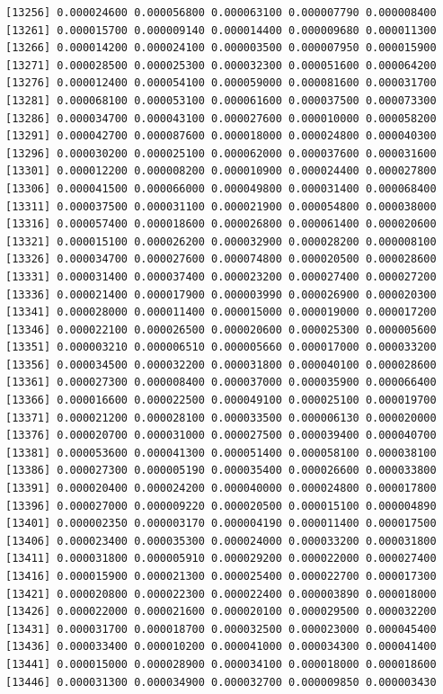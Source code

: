 \documentclass[]{article}
\begin{document}
\begin{verbatim}
[13256] 0.000024600 0.000056800 0.000063100 0.000007790 0.000008400
[13261] 0.000015700 0.000009140 0.000014400 0.000009680 0.000011300
[13266] 0.000014200 0.000024100 0.000003500 0.000007950 0.000015900
[13271] 0.000028500 0.000025300 0.000032300 0.000051600 0.000064200
[13276] 0.000012400 0.000054100 0.000059000 0.000081600 0.000031700
[13281] 0.000068100 0.000053100 0.000061600 0.000037500 0.000073300
[13286] 0.000034700 0.000043100 0.000027600 0.000010000 0.000058200
[13291] 0.000042700 0.000087600 0.000018000 0.000024800 0.000040300
[13296] 0.000030200 0.000025100 0.000062000 0.000037600 0.000031600
[13301] 0.000012200 0.000008200 0.000010900 0.000024400 0.000027800
[13306] 0.000041500 0.000066000 0.000049800 0.000031400 0.000068400
[13311] 0.000037500 0.000031100 0.000021900 0.000054800 0.000038000
[13316] 0.000057400 0.000018600 0.000026800 0.000061400 0.000020600
[13321] 0.000015100 0.000026200 0.000032900 0.000028200 0.000008100
[13326] 0.000034700 0.000027600 0.000074800 0.000020500 0.000028600
[13331] 0.000031400 0.000037400 0.000023200 0.000027400 0.000027200
[13336] 0.000021400 0.000017900 0.000003990 0.000026900 0.000020300
[13341] 0.000028000 0.000011400 0.000015000 0.000019000 0.000017200
[13346] 0.000022100 0.000026500 0.000020600 0.000025300 0.000005600
[13351] 0.000003210 0.000006510 0.000005660 0.000017000 0.000033200
[13356] 0.000034500 0.000032200 0.000031800 0.000040100 0.000028600
[13361] 0.000027300 0.000008400 0.000037000 0.000035900 0.000066400
[13366] 0.000016600 0.000022500 0.000049100 0.000025100 0.000019700
[13371] 0.000021200 0.000028100 0.000033500 0.000006130 0.000020000
[13376] 0.000020700 0.000031000 0.000027500 0.000039400 0.000040700
[13381] 0.000053600 0.000041300 0.000051400 0.000058100 0.000038100
[13386] 0.000027300 0.000005190 0.000035400 0.000026600 0.000033800
[13391] 0.000020400 0.000024200 0.000040000 0.000024800 0.000017800
[13396] 0.000027000 0.000009220 0.000020500 0.000015100 0.000004890
[13401] 0.000002350 0.000003170 0.000004190 0.000011400 0.000017500
[13406] 0.000023400 0.000035300 0.000024000 0.000033200 0.000031800
[13411] 0.000031800 0.000005910 0.000029200 0.000022000 0.000027400
[13416] 0.000015900 0.000021300 0.000025400 0.000022700 0.000017300
[13421] 0.000020800 0.000022300 0.000022400 0.000003890 0.000018000
[13426] 0.000022000 0.000021600 0.000020100 0.000029500 0.000032200
[13431] 0.000031700 0.000018700 0.000032500 0.000023000 0.000045400
[13436] 0.000033400 0.000010200 0.000041000 0.000034300 0.000041400
[13441] 0.000015000 0.000028900 0.000034100 0.000018000 0.000018600
[13446] 0.000031300 0.000034900 0.000032700 0.000009850 0.000003430

\end{verbatim}
\end{document}

